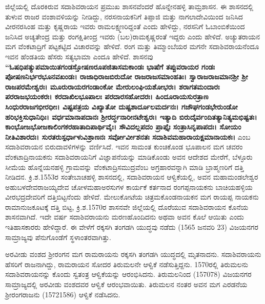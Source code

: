 ಜಿಲ್ಲೆಯಲ್ಲಿ ದೊರಕಿರುವ ಸದಾಶಿವರಾಯನ ಪ್ರಮುಖ ಶಾಸನವೆಂದರೆ ಹೊನ್ನೇನಹಳ್ಳಿ ತಾಮ್ರಶಾಸನ. ಈ ಶಾಸನದಲ್ಲಿ ತುಳುವ ರಾಜರ ವಂಶಾವಳಿಯನ್ನು ನೀಡಿದ್ದು, ನರಸನಾಯಕನಿಗೆ ತಿಪ್ಪಾಜಿ ಮತ್ತು ನಾಗಲಾದೇವಿಯಿಂದ ಜನಿಸಿದ ವೀರನರಸಿಂಹ ಮತ್ತು ಕೃಷ್ಣರಾಯ ಇವರು ರಾಮಲಕ್ಷ್ಮಣರಿದ್ದಂತೆ ಎಂದು ಹೇಳಿದ್ದು, ನರಸನಿಗೆ ಓಬಾಂಬಿಕೆಯಿಂದ ಜನಿಸಿದ ಅಚ್ಯತೇಂದ್ರ ಮತ್ತು ರಂಗಕ್ಷಿತೀಂದ್ರ ಇವರು (ಬಲ)ರಾಮಕೃಷ್ಣರಂತೆ ಇದ್ದರು ಎಂದು ಹೇಳಿದೆ. ಅಚ್ಯುತರಾಯನ ಮಗ ವೆಂಕಟಾದ್ರಿಗೆ ಪಟ್ಟಕಟ್ಟಿದ ವಿಚಾರವನ್ನು ಹೇಳಿದೆ. ರಂಗ ಮತ್ತು ತಿಮ್ಮಾಂಬೆಯರ ಮಗನೇ ಸದಾಶಿವರಾಯನೆಂದೂ ಇವನ ಹೆಂಡತಿಯ ಹೆಸರು ಸತ್ಯಭಾಮಾ ಎಂದೂ ಹೇಳಿದೆ. ಶಾಸನವು \textbf{“ಓಷಧಿಪತ್ಯುಪಮಾಯಿತಗಂಡಸ್ತೋಷಣರೂಪಜಿತಾಸಮಕಾಂಡಃ ಭಾಷೆಗೆ ತಪ್ಪುವರಾಯರ ಗಂಡಃ ಪೋಷಣನಿರ್ಭರಭೂನವಖಂಡಃ। ರಾಜಾಧಿರಾಜಬಿರುದೋ ರಾಜರಾಜಸಮಾಂಹತಿಃ। ಸ್ವಾರಾಜರಾಜಮಾನಶ‍್ರೀ ಶ‍್ರೀ ರಾಜಪರಮೇಶ್ವರಃ। ಮೂರುರಾಯರಗಂಡಾಂಕೋ ಮೇರುಲಂಘಿಯಶೋಭರಃ। ಶರಾಗತಮಂದಾರಃ ಪರರಾಜಭಯಂಕರಃ। ಕರದಾಖಿಲಭೂಪಾಲಃ ಪರದಾರಸಹೋದರಃ। ಹಿಂದೂರಾಯಸುರತ್ರಾಣ ಸಿಂಧುರರಾಜಗಭೀರಧೀಃ। ವಿಷ್ಟಪತ್ರಯ ವಿಖ್ಯಾತೋ ದುಷ್ಟಶಾರ್ದೂಲಮರ್ದನಃ। ಗಜೌಘಗಂಡಭೇರುಂಡೋ ಹರಿಭಕ್ತಿಸುಧಾನಿಧಿಃ। ವರ್ಧಮಾನಾಪದಾನಃ ಶ‍್ರೀರರ್ದ್ಧನಾರೀನಟೇಶ್ವರಃ। ಇತ್ಯಾದಿ ಬಿರುದೈರ್ವಂದಿತತ್ಯಾನಿತ್ಯಮಭಿಷ್ಟತಃ। ಕಾಂಭೋಜಭೋಜಕಾಲಿಂಗಕರಹಾತಾದಿಪಾರ್ಥಿವೈಃ। ಸೌವಿದಲ್ಲಪದಂ ಪ್ರಾಪ್ತೈಃ ಸಂತ್ರಾಸಿನೃಪಾಪದಃ। ಸೋಯಂ ನೀತಿವಿಶಾರದಃ। ಸುರತರುಸ್ಪರ್ಧಾಳುವಿಶ್ರಾಣನಃ ಸರ್ವೋರ್ವೀಶನತಃ ಸದಾಶಿವಮಹಾರಾಯಕ್ಷಮಾನಾಯಕಃ। }ಎಂಬ ಸದಾಶಿವರಾಯನ ಬಿರುದಾವಳಿಗಳನ್ನು ವರ್ಣಿಸಿದೆ. ಇವನ ಸಾಮಂತ ಕುಂಚಿಕೊಂಡ ಭೂಪಾಲನ ಮಗ ಚವರಂ ವೆಂಕಟಾದ್ರಿನಾಯಕನು ಸದಾಶಿವರಾಯನಿಗೆ ವಿಜ್ಞಾಪನೆಯನ್ನು ಮಾಡಿಕೊಂಡು ಅವನ ಆದೇಶದ ಮೇರೆಗೆ, ಬೆಳ್ಳೂರು ಸೀಮೆಯ ಹೊನ್ನೆಯನಹಳ್ಳಿ ಗ್ರಾಮವನ್ನು ವೆಂಕಟಾದ್ರಿಸಮುದ್ರವೆಂಬ ಅಗ್ರಹಾರವನ್ನಾಗಿ ಮಾಡಿ ಬ್ರಾಹ್ಮಣರಿಗೆ ದತ್ತಿ ನೀಡಿದನ. ಕ್ರಿ.ಶ.1553ರ ಸಂತೇಬಾಚಹಳ್ಳಿ ಶಾಸನದಲ್ಲಿ, ಸದಾಶಿವರಾಯನ ಆಳ್ವಿಕೆಯಲ್ಲಿ, ಅವನ ಮಹಾಮಂಡಲೇಶ್ವರ ಅಹುಬಳದೇವರಾಜಯ್ಯದೇವ ಚೋಳಮಹಾಅರಸುಗಳ ಕಾರ್ಯಕೆ ಕರ್ತನಾದ ರಂಗಪ್ಪನಾಯಕನು ಬಾಚಿಯಹಳ್ಳಿಯ ವೀರಭದ್ರದೇವರಿಗೆ ದತ್ತಿಬಿಟ್ಟನೆಂದು ಹೇಳಿದೆ. ಮೇಲುಕೋಟೆಯ ಚಿತ್ರಮಕೊಂಡನಾಯಕನ ಮಗ ರಾಯಪ್ಪ ನಾಯಕನು ರಾಮಾನುಜಕೂಟಕ್ಕೆ ದತ್ತಿ ಬಿಟ್ಟ, ಕ್ರಿ.ಶ.1570ರ ಶಾಸನವೇ ಜಿಲ್ಲೆಯಲ್ಲಿ ದೊರೆಯುವ ಸದಾಶಿವರಾಯನ ಕೊನೆಯ ಶಾಸನವಾಗಿದೆ. ಇದೇ ವರ್ಷ ಸದಾಶಿವರಾಯನು ಮರಣಹೊಂದಿದನು ಅಥವಾ ಅವನ ಕೊಲೆ ಆಯಿತು ಎಂದು ಇತಿಹಾಸಕಾರರು ಹೇಳಿದ್ದಾರೆ. ಈ ವೇಳೆಗೆ ರಕ್ಕಸಗಿ ತಂಗಡಗಿ ಯುದ್ಧವು ನಡೆದು (1565 ಜನವರಿ 23) ವಿಜಯನಗರ ಸಾಮ್ರಾಜ್ಯವು ಪೆನುಗೊಂಡೆಗೆ ಸ್ಥಳಾಂತರವಾಗಿತ್ತು. 

ಅರವೀಡು ವಂಶದ ಶ‍್ರೀರಂಗನ ಮಗ ರಾಮರಾಯನು ರಕ್ಕಸಗಿ ತಂಗಡಗಿ ಯುದ್ಧದಲ್ಲಿ ಮೃತನಾದನು. ಸದಾಶಿವರಾಯನು ಹೆಸರಿಗೆ ರಾಜನಾಗಿದ್ದು, ರಾಮರಾಯನ ಸೋದರ ತಿರುಮಲನೇ ಆಳ್ವಿಕೆ ನಡೆಸುತ್ತಿದ್ದನು. 1570ರಲ್ಲಿ ತಿರುಮಲನು ಸದಾಶಿವರಾಯನನ್ನು ಕೊಂದು ಸ್ವತಂತ್ರ ಆಳ್ವಿಕೆಯನ್ನು ಆರಂಭಿಸಿದನು. ತಿರುಮಲನಿಂದ (157078) ವಿಜಯನಗರ ಸಾಮ್ರಾಜ್ಯದಲ್ಲಿ ಅರವೀಡು ವಂಶದವರ ಆಳ್ವಿಕೆ ಆರಂಭವಾಯಿತು. ತಿರುಮಲನ ನಂತರ ಅವನ ಮಗ ಎರಡನೆಯ ಶ‍್ರೀರಂಗರಾಜನು (15721586) ಆಳ್ವಿಕೆ ನಡೆಸಿದನು.

